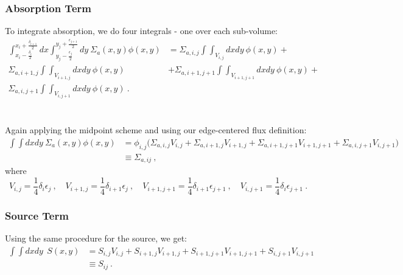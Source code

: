 \documentclass[12pt, answers]{exam}
\begin{document}
\subsubsection*{Absorption Term}
To integrate absorption, we do four integrals - one over each sub-volume:
%
\ifprintanswers
\begin{align}
\int_{x_i-\frac{\delta_{i}}{2}}^{x_i+\frac{\delta_{i+1}}{2}} dx \int_{y_j-\frac{\epsilon_{j}}{2}}^{y_j+\frac{\epsilon_{j+1}}{2}}dy\:\Sigma_a(x,y) \phi(x,y) &= \Sigma_{a,i,j}\int\int_{V_{i,j}} dx dy \: \phi(x,y) + \nonumber \\
%
\Sigma_{a,i+1,j}\int\int_{V_{i+1,j}} dx dy \: \phi(x,y) &+ \Sigma_{a,i+1,j+1}\int\int_{V_{i+1,j+1}} dx dy \: \phi(x,y) + \nonumber \\
 \Sigma_{a,i,j+1}\int\int_{V_{i,j+1}} dx dy \: \phi(x,y) \:.\nonumber
\end{align}
\else
\\ \vspace*{8em}\\
\fi
%
Again applying the midpoint scheme and using our edge-centered flux definition:
%
\begin{align}
\int \int dx dy\:\Sigma_a(x,y) \phi(x,y) &= \boxed{\phi_{i,j}\bigl(\Sigma_{a,i,j} V_{i,j} + \Sigma_{a,i+1,j} V_{i+1,j} + \Sigma_{a,i+1,j+1} V_{i+1,j+1} + \Sigma_{a,i,j+1} V_{i,j+1} \bigr) } \nonumber \\
&\equiv \Sigma_{a,ij}\:, \nonumber
\end{align}
%
where
\[V_{i,j} = \frac{1}{4}\delta_i \epsilon_j \:, \quad V_{i+1,j} = \frac{1}{4}\delta_{i+1} \epsilon_{j} \:, \quad V_{i+1,j+1} = \frac{1}{4}\delta_{i+1} \epsilon_{j+1} \:, \quad V_{i,j+1} = \frac{1}{4}\delta_{i} \epsilon_{j+1} \:.\]


\subsubsection*{Source Term}
Using the same procedure for the source, we get:
\begin{align}
\int \int dx dy \: \:S(x,y) &= \boxed{ S_{i,j} V_{i,j} + S_{i+1,j} V_{i+1,j} + S_{i+1,j+1} V_{i+1,j+1} + S_{i,j+1} V_{i,j+1} }\nonumber \\
&\equiv S_{ij}\:. \nonumber
\end{align}


\end{document}
